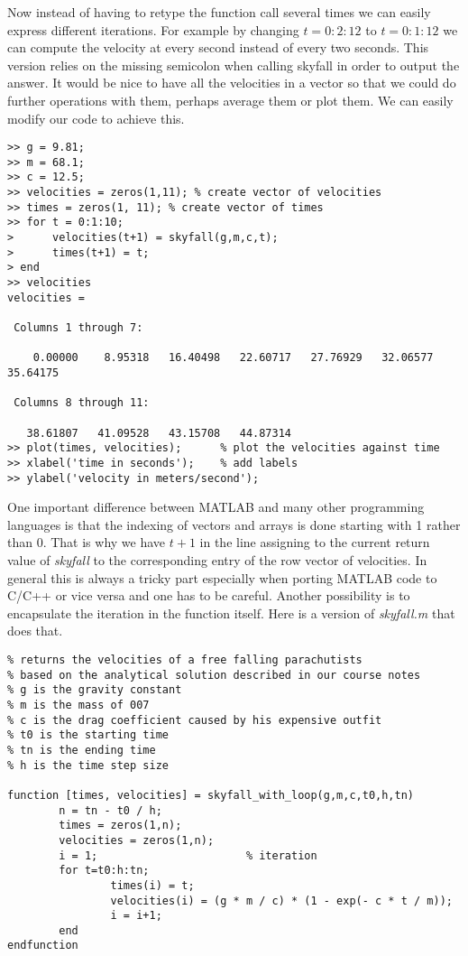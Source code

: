 \documentclass [titlepage,12pt,letter] {article}
\begin{document}
\indent 

Now instead of having to retype the function call several times we can
easily express different iterations. For example by changing $t =
0:2:12$ to $t = 0:1:12$ we can compute the velocity at every second
instead of every two seconds. This version relies on the missing
semicolon when calling skyfall in order to output the answer.  It
would be nice to have all the velocities in a vector so that we could
do further operations with them, perhaps average them or plot them. We can easily modify our code to achieve this. 


\begin{verbatim} 
>> g = 9.81;
>> m = 68.1;
>> c = 12.5;
>> velocities = zeros(1,11); % create vector of velocities 
>> times = zeros(1, 11); % create vector of times 
>> for t = 0:1:10; 
>      velocities(t+1) = skyfall(g,m,c,t); 
>      times(t+1) = t;
> end
>> velocities
velocities =

 Columns 1 through 7:

    0.00000    8.95318   16.40498   22.60717   27.76929   32.06577   35.64175

 Columns 8 through 11:

   38.61807   41.09528   43.15708   44.87314
>> plot(times, velocities);      % plot the velocities against time 
>> xlabel('time in seconds');    % add labels  
>> ylabel('velocity in meters/second');
\end{verbatim} 

\noindent 

One important difference between MATLAB and many other
programming languages is that the indexing of vectors and arrays is
done starting with 1 rather than 0. That is why we have $t+1$ in the
line assigning to the current return value of {\it skyfall} to the
corresponding entry of the row vector of velocities. In general this
is always a tricky part especially when porting MATLAB code to C/C++
or vice versa and one has to be careful. Another possibility is to 
encapsulate the iteration in the function itself. Here is a version 
of {\it skyfall.m} that does that. 

\begin{verbatim} 
% returns the velocities of a free falling parachutists
% based on the analytical solution described in our course notes
% g is the gravity constant
% m is the mass of 007
% c is the drag coefficient caused by his expensive outfit
% t0 is the starting time
% tn is the ending time
% h is the time step size

function [times, velocities] = skyfall_with_loop(g,m,c,t0,h,tn)
        n = tn - t0 / h;
        times = zeros(1,n);
        velocities = zeros(1,n);
        i = 1;                       % iteration
        for t=t0:h:tn;
                times(i) = t;
                velocities(i) = (g * m / c) * (1 - exp(- c * t / m));
                i = i+1;
        end
endfunction
\end{verbatim} 
\end{document}
